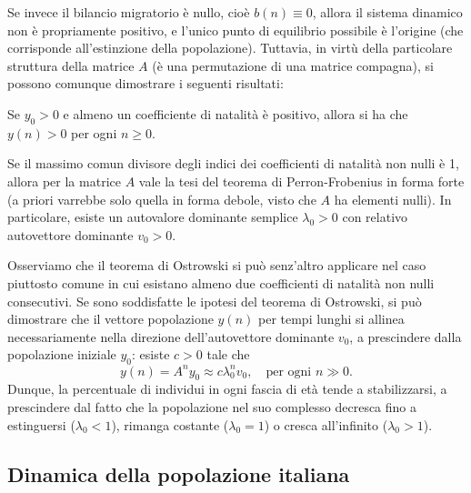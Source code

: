 Se invece il bilancio migratorio è nullo, cioè $b(n) \equiv 0$, allora
il sistema dinamico non è propriamente positivo, e l'unico punto di
equilibrio possibile è l'origine (che corrisponde all'estinzione della popolazione).
Tuttavia, in virtù della particolare struttura della matrice $A$ (è una
permutazione di una matrice compagna), si possono comunque dimostrare i seguenti
risultati:

\begin{teor}
Se $y_0 > 0$ e almeno un coefficiente di natalità è positivo, allora
si ha che $y(n) > 0$ per ogni $n \geq 0$.
\end{teor}

\begin{teor}[Ostrowski]
Se il massimo comun divisore degli indici dei coefficienti di natalità
non nulli è 1, allora per la matrice $A$ vale la tesi del teorema di Perron-Frobenius
in forma forte (a priori varrebbe solo quella in forma debole, visto che
$A$ ha elementi nulli). In particolare, esiste un autovalore dominante semplice
$\lambda_0 > 0$ con relativo autovettore dominante $v_0 > 0$.
\end{teor}

\noindent Osserviamo che il teorema di Ostrowski si può senz'altro applicare nel
caso piuttosto comune in cui esistano almeno due coefficienti di natalità
non nulli consecutivi. Se sono soddisfatte le ipotesi del teorema
di Ostrowski, si può dimostrare che il vettore popolazione $y(n)$
per tempi lunghi si allinea necessariamente nella direzione dell'autovettore
dominante $v_0$, a prescindere dalla popolazione iniziale $y_0$:
esiste $c > 0$ tale che
\[
y(n) = A^n y_0 \approx c \lambda_0^n v_0,
\quad \text{per ogni $n \gg 0$}.
\]
Dunque, la percentuale di individui in ogni fascia di età tende a stabilizzarsi,
a prescindere dal fatto che la popolazione nel suo complesso decresca fino a
estinguersi ($\lambda_0 < 1$), rimanga costante ($\lambda_0 = 1$)
o cresca all'infinito ($\lambda_0 > 1$).

\subsection*{Dinamica della popolazione italiana}

